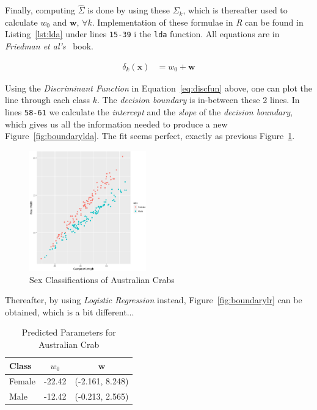 \documentclass[a4paper, twocolumn]{article}
\begin{document}
        Finally, computing $\hat{\Sigma}$ is done by using these $\Sigma_k$, which is thereafter used to calculate $w_0$ and $\bm{w},\, \forall k$. Implementation of these formulae in \emph{R} can be found in Listing~\ref{lst:lda} under lines \texttt{15-39} i the \texttt{lda} function. All equations are in \emph{Friedman et al's}~\cite{friedman2009elements} book.

        \begin{equation} \label{eq:discfun}
        \begin{split}
            \delta_k(\bm{x}) &= w_0 + \bm{w}
        \end{split}
        \end{equation}

        Using the \emph{Discriminant Function} in Equation~\ref{eq:discfun} above, one can plot the line through each class $k$. The \emph{decision boundary} is in-between these 2 lines. In lines \texttt{58-61} we calculate the \emph{intercept} and the \emph{slope} of the \emph{decision boundary}, which gives us all the information needed to produce a new Figure~\ref{fig:boundarylda}. The fit seems perfect, exactly as previous Figure~\ref{fig:crabs}.

        \begin{figure}[h!]
            \centering
            \caption{Sex Classifications of Australian Crabs}
            \label{fig:crabs}
            \includegraphics[width=0.45\textwidth]{share/crabs.eps}
        \end{figure}

        \clearpage

        Thereafter, by using \emph{Logistic Regression} instead, Figure~\ref{fig:boundarylr} can be obtained, which is a bit different...

        \begin{table}[h!]
        \begin{center}
        \begin{tabular}{lcc}
            \toprule
                \textbf{Class} & $w_0$ & $\bm{w}$ \\
            \midrule
                Female & -22.42 & (-2.161, 8.248) \\
                Male & -12.42 & (-0.213, 2.565) \\
            \bottomrule
        \end{tabular}
        \end{center}
        \caption{Predicted Parameters for Australian Crab}
        \label{table:parameters}
        \end{table}
\end{document}
